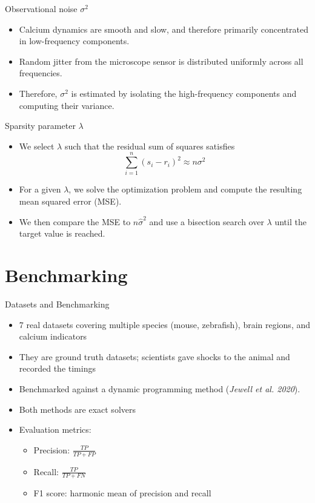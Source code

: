 \documentclass[15pt]{beamer}
\theoremstyle{definition}
\begin{document}
\begin{frame}{Observational noise $\sigma^2$}
 
 
\begin{itemize}
	\item Calcium dynamics are smooth and slow, and therefore primarily concentrated in low-frequency components.
	\item Random jitter from the microscope sensor is distributed uniformly across all frequencies.
	\item Therefore, $\sigma^2$ is estimated by isolating the high-frequency components and computing their variance.
\end{itemize}


\end{frame}

 

\begin{frame}{Sparsity parameter $\lambda$}
	\begin{itemize}
		\item We select $\lambda$ such that the residual sum of squares satisfies
		\begin{equation*}
			\sum_{i=1}^{n} (s_i - r_i)^2 \approx n \sigma^2
		\end{equation*}
		\item For a given $\lambda$, we solve the optimization problem and compute the resulting mean squared error (MSE).
		\item We then compare the MSE to $n \hat{\sigma}^2$ and use a bisection search over $\lambda$ until the target value is reached.
	\end{itemize}
\end{frame}


 \section{Benchmarking}

\begin{frame}{Datasets and Benchmarking}
	\begin{itemize}
		\item 7 real datasets covering multiple species (mouse, zebrafish), brain regions, and calcium indicators
		\item They are ground truth datasets; scientists gave shocks to the animal and recorded the timings
		\item Benchmarked against a dynamic programming method (\textit{Jewell et al. 2020}).
		\item Both methods are exact solvers
		\item Evaluation metrics:
		\begin{itemize}
			\item Precision: $\frac{TP}{TP + FP}$
			\item Recall: $\frac{TP}{TP + FN}$
			\item F1 score: harmonic mean of precision and recall
		\end{itemize}
	\end{itemize}
\end{frame}
\end{document}
